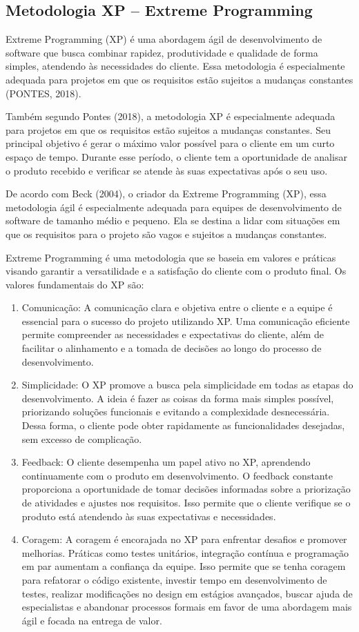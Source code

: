 \subsection{Metodologia XP – Extreme Programming}
Extreme Programming (XP) é uma abordagem ágil de desenvolvimento de software que busca combinar rapidez, produtividade e qualidade de forma simples, atendendo às necessidades do cliente. Essa metodologia é especialmente adequada para projetos em que os requisitos estão sujeitos a mudanças constantes (PONTES, 2018).

Também segundo Pontes (2018), a metodologia XP é especialmente adequada para projetos em que os requisitos estão sujeitos a mudanças constantes. Seu principal objetivo é gerar o máximo valor possível para o cliente em um curto espaço de tempo. Durante esse período, o cliente tem a oportunidade de analisar o produto recebido e verificar se atende às suas expectativas após o seu uso.

De acordo com Beck (2004), o criador da Extreme Programming (XP), essa metodologia ágil é especialmente adequada para equipes de desenvolvimento de software de tamanho médio e pequeno. Ela se destina a lidar com situações em que os requisitos para o projeto são vagos e sujeitos a mudanças constantes.

Extreme Programming é uma metodologia que se baseia em valores e práticas visando garantir a versatilidade e a satisfação do cliente com o produto final. Os valores fundamentais do XP são:

\begin{enumerate}
	\item Comunicação: A comunicação clara e objetiva entre o cliente e a equipe é essencial para o sucesso do projeto utilizando XP. Uma comunicação eficiente permite compreender as necessidades e expectativas do cliente, além de facilitar o alinhamento e a tomada de decisões ao longo do processo de desenvolvimento.
	\item Simplicidade: O XP promove a busca pela simplicidade em todas as etapas do desenvolvimento. A ideia é fazer as coisas da forma mais simples possível, priorizando soluções funcionais e evitando a complexidade desnecessária. Dessa forma, o cliente pode obter rapidamente as funcionalidades desejadas, sem excesso de complicação.
	\item Feedback: O cliente desempenha um papel ativo no XP, aprendendo continuamente com o produto em desenvolvimento. O feedback constante proporciona a oportunidade de tomar decisões informadas sobre a priorização de atividades e ajustes nos requisitos. Isso permite que o cliente verifique se o produto está atendendo às suas expectativas e necessidades.
	\item Coragem: A coragem é encorajada no XP para enfrentar desafios e promover melhorias. Práticas como testes unitários, integração contínua e programação em par aumentam a confiança da equipe. Isso permite que se tenha coragem para refatorar o código existente, investir tempo em desenvolvimento de testes, realizar modificações no design em estágios avançados, buscar ajuda de especialistas e abandonar processos formais em favor de uma abordagem mais ágil e focada na entrega de valor.
\end{enumerate}

